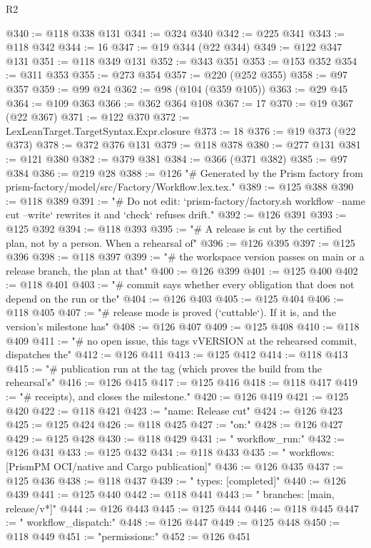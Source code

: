 \begin{lexlean}{R2}
\begin{coremodule}
@340 := @118 @338 @131
@341 := @324 @340
@342 := @225 @341
@343 := @118 @342
@344 := 16
@347 := @19 @344 (@22 @344)
@349 := @122 @347 @131
@351 := @118 @349 @131
@352 := @343 @351
@353 := @153 @352
@354 := @311 @353
@355 := @273 @354
@357 := @220 (@252 @355)
@358 := @97 @357
@359 := @99 @24
@362 := @98 (@104 (@359 @105))
@363 := @29 @45
@364 := @109 @363
@366 := @362 @364 @108
@367 := 17
@370 := @19 @367 (@22 @367)
@371 := @122 @370
@372 := LexLeanTarget.TargetSyntax.Expr.closure
@373 := 18
@376 := @19 @373 (@22 @373)
@378 := @372 @376 @131
@379 := @118 @378
@380 := @277 @131
@381 := @121 @380
@382 := @379 @381
@384 := @366 (@371 @382)
@385 := @97 @384
@386 := @219 @28
@388 := @126
    "# Generated by the Prism factory from prism-factory/model/src/Factory/Workflow.lex.tex."
@389 := @125 @388
@390 := @118 @389
@391 := "# Do not edit: `prism-factory/factory.sh workflow --name cut --write` rewrites it and `check` refuses drift."
@392 := @126 @391
@393 := @125 @392
@394 := @118 @393
@395 := "# A release is cut by the certified plan, not by a person. When a rehearsal of"
@396 := @126 @395
@397 := @125 @396
@398 := @118 @397
@399 := "# the workspace version passes on main or a release branch, the plan at that"
@400 := @126 @399
@401 := @125 @400
@402 := @118 @401
@403 := "# commit says whether every obligation that does not depend on the run or the"
@404 := @126 @403
@405 := @125 @404
@406 := @118 @405
@407 := "# release mode is proved (`cuttable`). If it is, and the version's milestone has"
@408 := @126 @407
@409 := @125 @408
@410 := @118 @409
@411 := "# no open issue, this tags vVERSION at the rehearsed commit, dispatches the"
@412 := @126 @411
@413 := @125 @412
@414 := @118 @413
@415 := "# publication run at the tag (which proves the build from the rehearsal's"
@416 := @126 @415
@417 := @125 @416
@418 := @118 @417
@419 := "# receipts), and closes the milestone."
@420 := @126 @419
@421 := @125 @420
@422 := @118 @421
@423 := "name: Release cut"
@424 := @126 @423
@425 := @125 @424
@426 := @118 @425
@427 := "on:"
@428 := @126 @427
@429 := @125 @428
@430 := @118 @429
@431 := "  workflow_run:"
@432 := @126 @431
@433 := @125 @432
@434 := @118 @433
@435 := "    workflows: [PrismPM OCI/native and Cargo publication]"
@436 := @126 @435
@437 := @125 @436
@438 := @118 @437
@439 := "    types: [completed]"
@440 := @126 @439
@441 := @125 @440
@442 := @118 @441
@443 := "    branches: [main, release/v*]"
@444 := @126 @443
@445 := @125 @444
@446 := @118 @445
@447 := "  workflow_dispatch:"
@448 := @126 @447
@449 := @125 @448
@450 := @118 @449
@451 := "permissions:"
@452 := @126 @451

\end{coremodule}
\end{lexlean}
